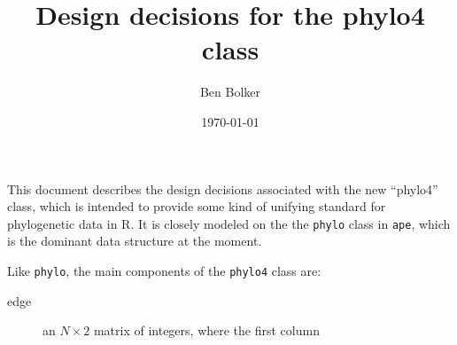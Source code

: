 \documentclass{article}
\title{Design decisions for the phylo4 class}
\author{Ben Bolker}
\date{\today}
\newcommand{\code}[1]{{{\tt #1}}}
\begin{document}
\maketitle

This document describes the design decisions associated
with the new ``phylo4'' class, which is intended to
provide some kind of unifying standard for phylogenetic
data in R.  It is closely modeled on the the \code{phylo}
class in \code{ape}, which is the dominant data structure
at the moment.

Like \code{phylo}, the main components of
the \code{phylo4} class are:
\begin{description}
\item[edge]{an $N \times 2$ matrix of integers,
  where the first column}
\end{description}
 
\end{document}
